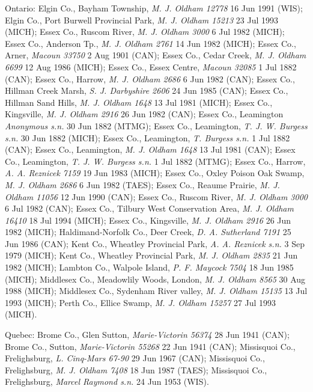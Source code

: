 \documentclass{article}
\begin{document}
Ontario:
Elgin Co., Bayham Township, \textit{M. J. Oldham 12778} 16 Jun 1991 (WIS);
Elgin Co., Port Burwell Provincial Park, \textit{M. J. Oldham 15213} 23 Jul 1993 (MICH);
Essex Co., Ruscom River, \textit{M. J. Oldham 3000} 6 Jul 1982 (MICH);
Essex Co., Anderson Tp., \textit{M. J. Oldham 2761} 14 Jun 1982 (MICH);
Essex Co., Arner, \textit{Macoun 33750} 2 Aug 1901 (CAN);
Essex Co., Cedar Creek, \textit{M. J. Oldham 6699} 12 Aug 1986 (MICH);
Essex Co., Essex Centre, \textit{Macoun 32085} 1 Jul 1882 (CAN);
Essex Co., Harrow, \textit{M. J. Oldham 2686} 6 Jun 1982 (CAN);
Essex Co., Hillman Creek Marsh, \textit{S. J. Darbyshire 2606} 24 Jun 1985 (CAN);
Essex Co., Hillman Sand Hills, \textit{M. J. Oldham 1648} 13 Jul 1981 (MICH);
Essex Co., Kingsville, \textit{M. J. Oldham 2916} 26 Jun 1982 (CAN);
Essex Co., Leamington  \textit{Anonymous s.n.} 30 Jun 1882 (MTMG);
Essex Co., Leamington, \textit{T. J. W. Burgess s.n.} 30 Jun 1882 (MICH);
Essex Co., Leamington, \textit{T. Burgess s.n.} 1 Jul 1882 (CAN);
Essex Co., Leamington, \textit{M. J. Oldham 1648} 13 Jul 1981 (CAN);
Essex Co., Leamington, \textit{T. J. W. Burgess s.n.} 1 Jul 1882 (MTMG);
Essex Co., Harrow, \textit{A. A. Reznicek 7159} 19 Jun 1983 (MICH);
Essex Co., Oxley Poison Oak Swamp, \textit{M. J. Oldham 2686} 6 Jun 1982 (TAES);
Essex Co., Reaume Prairie, \textit{M. J. Oldham 11056} 12 Jun 1990 (CAN);
Essex Co., Ruscom River, \textit{M. J. Oldham 3000} 6 Jul 1982 (CAN);
Essex Co., Tilbury West Conservation Area, \textit{M. J. Oldham 16410} 18 Jul 1994 (MICH);
Essex Co., Kingsville, \textit{M. J. Oldham 2916} 26 Jun 1982 (MICH);
Haldimand-Norfolk Co., Deer Creek, \textit{D. A. Sutherland 7191} 25 Jun 1986 (CAN);
Kent Co., Wheatley Provincial Park, \textit{A. A. Reznicek s.n.} 3 Sep 1979 (MICH);
Kent Co., Wheatley Provincial Park, \textit{M. J. Oldham 2835} 21 Jun 1982 (MICH);
Lambton Co., Walpole Island, \textit{P. F. Maycock 7504} 18 Jun 1985 (MICH);
Middlesex Co., Meadowlily Woods, London, \textit{M. J. Oldham 8565} 30 Aug 1988 (MICH);
Middlesex Co., Sydenham River valley, \textit{M. J. Oldham 15135} 13 Jul 1993 (MICH);
Perth Co., Ellice Swamp, \textit{M. J. Oldham 15257} 27 Jul 1993 (MICH).

Quebec:
Brome Co., Glen Sutton, \textit{Marie-Victorin 56374} 28 Jun 1941 (CAN);
Brome Co., Sutton, \textit{Marie-Victorin 55268} 22 Jun 1941 (CAN);
Missisquoi Co., Frelighsburg, \textit{L. Cinq-Mars 67-90} 29 Jun 1967 (CAN);
Missisquoi Co., Frelighsburg, \textit{M. J. Oldham 7408} 18 Jun 1987 (TAES);
Missisquoi Co., Frelighsburg, \textit{Marcel Raymond s.n.} 24 Jun 1953 (WIS).
\end{document}
